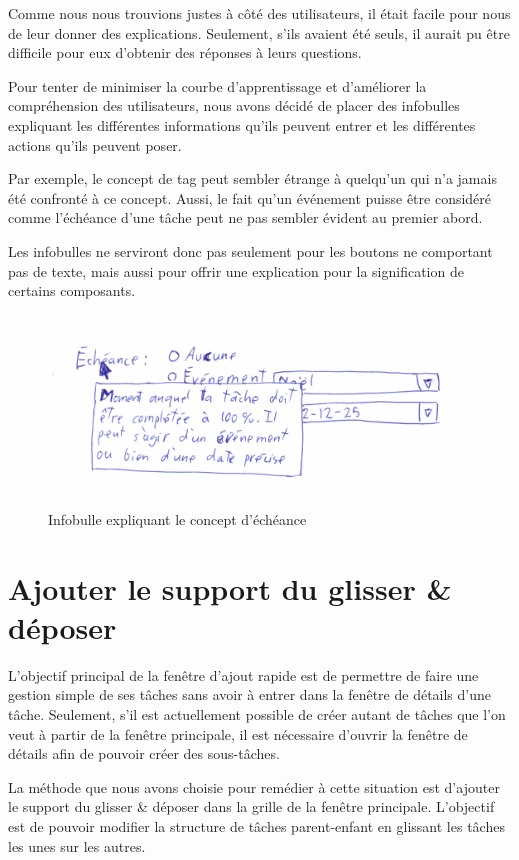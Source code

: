\documentclass[letterpaper, oneside, 12pt, these, creativecommons]{thETS}
\begin{document}
Comme nous nous trouvions justes à côté des utilisateurs, il était facile pour nous de leur donner des explications. Seulement, s'ils avaient été seuls, il aurait pu être difficile pour eux d'obtenir des réponses à leurs questions.

Pour tenter de minimiser la courbe d'apprentissage et d'améliorer la compréhension des utilisateurs, nous avons décidé de placer des infobulles expliquant les différentes informations qu'ils peuvent entrer et les différentes actions qu'ils peuvent poser.

Par exemple, le concept de tag peut sembler étrange à quelqu'un qui n'a jamais été confronté à ce concept. Aussi, le fait qu'un événement puisse être considéré comme l'échéance d'une tâche peut ne pas sembler évident au premier abord.

Les infobulles ne serviront donc pas seulement pour les boutons ne comportant pas de texte, mais aussi pour offrir une explication pour la signification de certains composants.

\begin{figure}
    \includegraphics[scale=0.2]{infobulle.png}
    \caption{Infobulle expliquant le concept d'échéance}
\end{figure}

\section{Ajouter le support du glisser \& déposer}

L'objectif principal de la fenêtre d'ajout rapide est de permettre de faire une gestion simple de ses tâches sans avoir à entrer dans la fenêtre de détails d'une tâche. Seulement, s'il est actuellement possible de créer autant de tâches que l'on veut à partir de la fenêtre principale, il est nécessaire d'ouvrir la fenêtre de détails afin de pouvoir créer des sous-tâches.

La méthode que nous avons choisie pour remédier à cette situation est d'ajouter le support du glisser \& déposer dans la grille de la fenêtre principale. L'objectif est de pouvoir modifier la structure de tâches parent-enfant en glissant les tâches les unes sur les autres.
\end{document}
